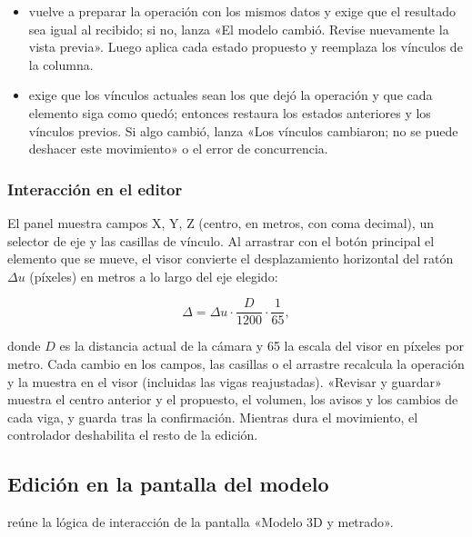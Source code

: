 \begin{itemize}
	\item {} vuelve a preparar la operación con los mismos datos y exige que
	      el resultado sea igual al recibido; si no, lanza «El modelo cambió. Revise nuevamente la vista previa». Luego
	      aplica cada estado propuesto y reemplaza los vínculos de la columna.
	\item {} exige que los vínculos actuales sean los que dejó la operación y
	      que cada elemento siga como quedó; entonces restaura los estados anteriores y los vínculos previos. Si algo
	      cambió, lanza «Los vínculos cambiaron; no se puede deshacer este movimiento» o el error de concurrencia.
\end{itemize}

\subsubsection{Interacción en el editor}

El panel muestra campos X, Y, Z (centro, en metros, con coma decimal), un selector de eje y las casillas de vínculo.
Al arrastrar con el botón principal el elemento que se mueve, el visor convierte el desplazamiento horizontal del ratón
$\Delta u$ (píxeles) en metros a lo largo del eje elegido:

\begin{equation}
	\Delta = \Delta u \cdot \frac{D}{1200} \cdot \frac{1}{65},
\end{equation}

\noindent donde $D$ es la distancia actual de la cámara y 65 la escala del visor en píxeles por metro. Cada cambio en
los campos, las casillas o el arrastre recalcula la operación y la muestra en el visor (incluidas las vigas
reajustadas). «Revisar y guardar» muestra el centro anterior y el propuesto, el volumen, los avisos y los cambios de
cada viga, y guarda tras la confirmación. Mientras dura el movimiento, el controlador deshabilita el resto de la
edición.

\subsection{Edición en la pantalla del modelo}
\label{sec:mod-pantalla}

 reúne la lógica de interacción de la pantalla «Modelo 3D y metrado».


